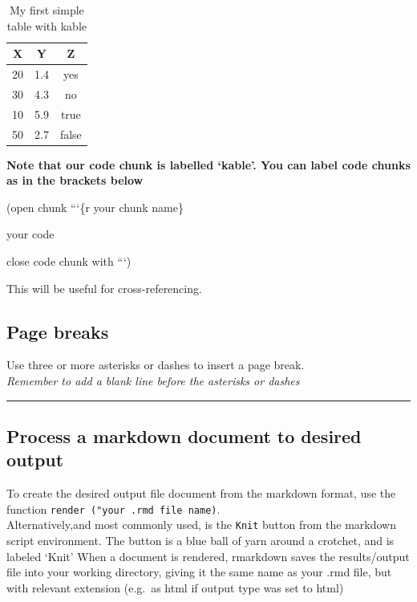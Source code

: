 \documentclass[
]{book}
\begin{document}
\begin{table}

\caption{\label{tab:kable}My first simple table with kable}
\centering
\begin{tabular}[t]{c|c|c}
\hline
X & Y & Z\\
\hline
20 & 1.4 & yes\\
\hline
30 & 4.3 & no\\
\hline
10 & 5.9 & true\\
\hline
50 & 2.7 & false\\
\hline
\end{tabular}
\end{table}

\textbf{Note that our code chunk is labelled `kable'. You can label code chunks as in the brackets below}

(open chunk ```\{r your chunk name\}

your code

close code chunk with ```)

This will be useful for cross-referencing.

\hypertarget{page-breaks}{%
\subsection{Page breaks}\label{page-breaks}}

Use three or more asterisks or dashes to insert a page break.\\
\emph{Remember to add a blank line before the asterisks or dashes}

\begin{center}\rule{0.5\linewidth}{0.5pt}\end{center}

\hypertarget{process-a-markdown-document-to-desired-output}{%
\subsection{Process a markdown document to desired output}\label{process-a-markdown-document-to-desired-output}}

To create the desired output file document from the markdown format, use the function \texttt{render\ ("your\ .rmd\ file\ name)}.\\
Alternatively,and most commonly used, is the \texttt{Knit} button from the markdown script environment. The button is a blue ball of yarn around a crotchet, and is labeled `Knit'
When a document is rendered, rmarkdown saves the results/output file into your working directory, giving it the same name as your .rmd file, but with relevant extension (e.g.~as html if output type was set to html)
\end{document}
